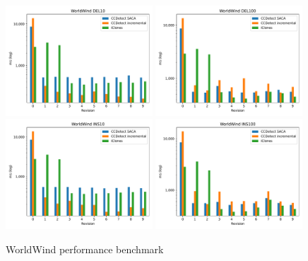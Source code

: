 \begin{figure}[H]
    \begin{center}
        \includegraphics[width=0.49\textwidth]{figures/performancegraphs/WorldWind_DEL10.pdf}
        \includegraphics[width=0.49\textwidth]{figures/performancegraphs/WorldWind_DEL100.pdf}
        \includegraphics[width=0.49\textwidth]{figures/performancegraphs/WorldWind_INS10.pdf}
        \includegraphics[width=0.49\textwidth]{figures/performancegraphs/WorldWind_INS100.pdf}
    \end{center}
    \caption{WorldWind performance benchmark}
    \label{fig:WorldWind}
\end{figure}

